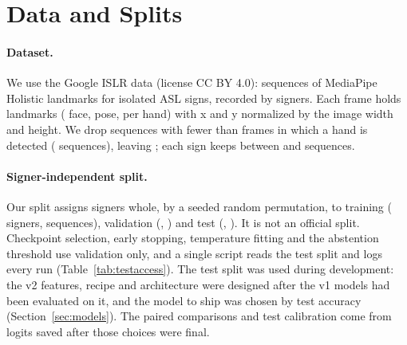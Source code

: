 \section{Data and Splits}
\label{sec:data}

\paragraph{Dataset.}
We use the Google ISLR data \citep{kaggle2023islr} (license CC BY 4.0):  sequences
of MediaPipe Holistic landmarks for  isolated ASL signs, recorded by
 signers. Each frame holds  landmarks ( face,
 pose,  per hand) with x and y normalized by the image width and
height. We drop sequences with fewer than  frames in which a hand is detected
( sequences), leaving ; each sign keeps between  and
 sequences.

\paragraph{Signer-independent split.}
Our split assigns signers whole, by a seeded random permutation, to training
( signers,  sequences), validation (,
) and test (, ). It is not an official split.
Checkpoint selection, early stopping, temperature fitting and the abstention threshold use
validation only, and a single script reads the test split and logs every run
(Table~\ref{tab:testaccess}). The test split was used during development: the v2
features, recipe and architecture were designed after the v1 models had been evaluated on it, and
the model to ship was chosen by test accuracy (Section~\ref{sec:models}). The paired comparisons
and test calibration come from logits saved after those choices were final.

